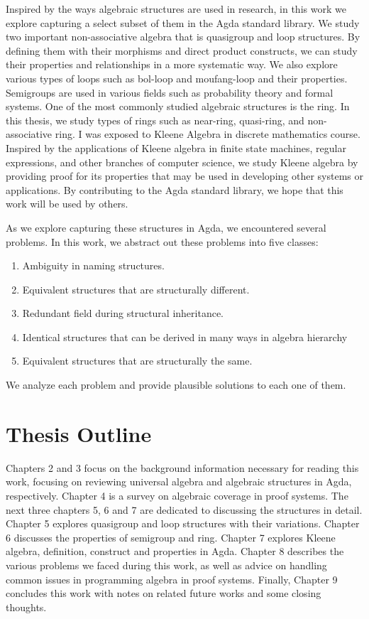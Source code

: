 Inspired by the ways algebraic structures are used in research, in this work we
explore capturing a select subset of them in the Agda standard library. We study
two important non-associative algebra that is quasigroup and loop structures. By
defining them with their morphisms and direct product constructs, we can study
their properties and relationships in a more systematic way. We also explore
various types of loops such as bol-loop and moufang-loop and their properties.
Semigroups are used in various fields such as probability theory and formal
systems. One of the most commonly studied algebraic structures is the ring. In
this thesis, we study types of rings such as near-ring, quasi-ring, and
non-associative ring. I was exposed to Kleene Algebra in discrete mathematics
course. Inspired by the applications of Kleene algebra in finite state machines,
regular expressions, and other branches of computer science, we study Kleene
algebra by providing proof for its properties that may be used in developing
other systems or applications. By contributing to the Agda standard library, we
hope that this work will be used by others. 

As we explore capturing these structures in Agda, we encountered several
problems. In this work, we abstract out these problems into five classes:
\begin{enumerate}
\item Ambiguity in naming structures.
\item Equivalent structures that are structurally different.
\item Redundant field during structural inheritance.
\item Identical structures that can be derived in many ways in algebra hierarchy
\item Equivalent structures that are structurally the same.
\end{enumerate}
We analyze each problem and provide plausible solutions to each one of them.

\section{Thesis Outline}
Chapters 2 and 3 focus on the background information necessary for reading this
work, focusing on reviewing universal algebra and algebraic structures in Agda,
respectively. Chapter 4 is a survey on algebraic coverage in proof systems. The
next three chapters 5, 6 and 7 are dedicated to discussing the structures in
detail. Chapter 5 explores quasigroup and loop structures with their variations.
Chapter 6 discusses the properties of semigroup and ring. Chapter 7 explores
Kleene algebra, definition, construct and properties in Agda. Chapter 8
describes the various problems we faced during this work, as well as advice on
handling common issues in programming algebra in proof systems. Finally,
Chapter 9 concludes this work with notes on related future works and some
closing thoughts.

